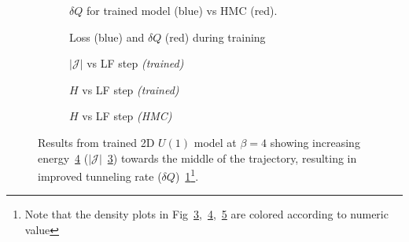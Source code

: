 \documentclass[a4paper,11pt]{article}
\begin{document}
\begin{figure}[htpb!]
    \centering
    \hfill
    \begin{subfigure}{0.4\textwidth}
        
        \caption{\label{subfig:dqhist}$\delta Q$ for trained model (blue) vs HMC (red).}
    \end{subfigure}
    \hfill
    \begin{subfigure}{0.55\textwidth}
        
        \caption{\label{subfig:loss_dQint}Loss (blue) and $\delta Q$ (red) during training}
    \end{subfigure}
    \hfill
    \begin{subfigure}{0.31\textwidth}
        
        \caption{\label{subfig:logdet2dU1}$|\mathcal{J}|$ vs LF step \emph{(trained)}}
    \end{subfigure}
    \hfill
    \begin{subfigure}{0.31\textwidth}
        
        \caption{\label{subfig:energy2dU1}$H$ vs LF step \emph{(trained)}}
    \end{subfigure}
    \hfill
    \begin{subfigure}{0.31\textwidth}
        
        \caption{\label{subfig:energy2dU1hmc}$H$ vs LF step \emph{(HMC)}}
    \end{subfigure}
    \hfill
    \caption{\label{fig:2dU1}Results from trained 2D $U(1)$ model at $\beta = 4$ showing increasing energy~\ref{subfig:energy2dU1} ($|\mathcal{J}|$~\ref{subfig:logdet2dU1}) towards the middle of the trajectory, resulting in improved tunneling rate ($\delta Q$)~\ref{subfig:dqhist}\footnote{Note that the density plots in Fig~\ref{subfig:logdet2dU1},~\ref{subfig:energy2dU1},~\ref{subfig:energy2dU1hmc} are colored according to numeric value}.}
\end{figure}
\end{document}
